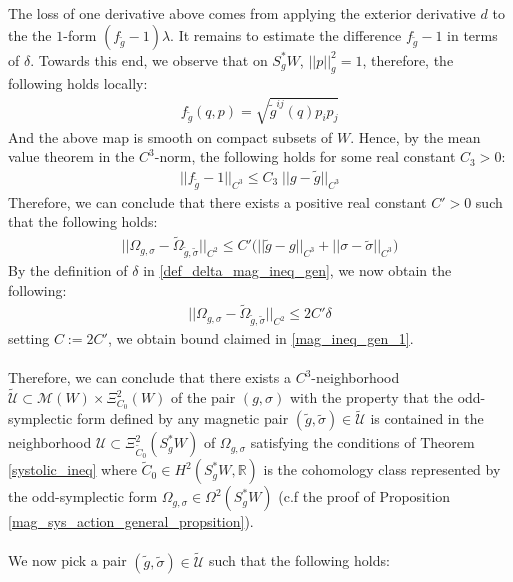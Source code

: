 \documentclass[11pt]{amsart}
\theoremstyle{plain}
\theoremstyle{definition}
\theoremstyle{remark}
\begin{document}
The loss of one derivative above comes from applying the exterior derivative $d$ to the the $1$-form $(f_{\tilde g} -1) \lambda$. It remains to estimate the difference $f_{\tilde g} -1$ in terms of $\delta$. Towards this end, we observe that on $S_g^*W$, $\vert\vert p\vert\vert^2_g =1$, therefore, the following holds locally:
\begin{align}
    f_{\tilde g}(q,p)= \sqrt{\tilde g^{ij}(q)p_ip_j }
\end{align}
And the above map is smooth on compact subsets of $W$. Hence, by the mean value theorem in the $C^3$-norm, the following holds for some real constant $C_3>0$:
\begin{align}
    \big\vert\big\vert  f_{\tilde g} -1\big\vert\big\vert_{C^3} \leq  C_3\;  \big\vert\big\vert g -\tilde g\big\vert\big\vert_{C^3}
\end{align}
Therefore, we can conclude that there exists a positive real constant $C'>0$ such that the following holds:
\begin{align}
    \big\vert\big\vert \Omega_{g,\sigma} -  \tilde \Omega_{\tilde g,\tilde \sigma}\big\vert\big\vert_{C^2} \leq C'\big(  \big\vert\big\vert \tilde g-g \big\vert\big\vert_{C^3} + \big\vert\big\vert \sigma -\tilde \sigma\big\vert\big\vert_{C^3}\big)
\end{align}
By the definition of $\delta$ in \eqref{def_delta_mag_ineq_gen}, we now obtain the following:
\begin{align}
    \big\vert\big\vert \Omega_{g,\sigma} -  \tilde \Omega_{\tilde g,\tilde \sigma}\big\vert\big\vert_{C^2} \leq 2C'\delta 
\end{align}
setting $C:= 2C'$, we obtain bound claimed in \eqref{mag_ineq_gen_1}.\\
\\
Therefore, we can conclude that there exists a $C^3$-neighborhood $\tilde{\mathcal{U}} \subset \mathcal{M}(W) \times \Xi^2_{C_0}(W)$ of the pair $(g,\sigma)$ with the property that the odd-symplectic form defined by any magnetic pair $(\tilde g,\tilde \sigma) \in \tilde{\mathcal{U}}$ is contained in the neighborhood $\mathcal{U} \subset \Xi^2_{\tilde C_0}(S_g^*W)$ of $\Omega_{g,\sigma}$ satisfying the conditions of Theorem \ref{systolic_ineq} where $\tilde C_0 \in H^2(S_g^*W,\mathbb{R})$ is the cohomology class represented by the odd-symplectic form $\Omega_{g,\sigma} \in \Omega^2(S_g^*W)$ (c.f the proof of Proposition \ref{mag_sys_action_general_propsition}).\\
\\
We now pick a pair $(\tilde g,\tilde \sigma) \in \tilde{\mathcal{U}}$ such that the following holds:
\end{document}
